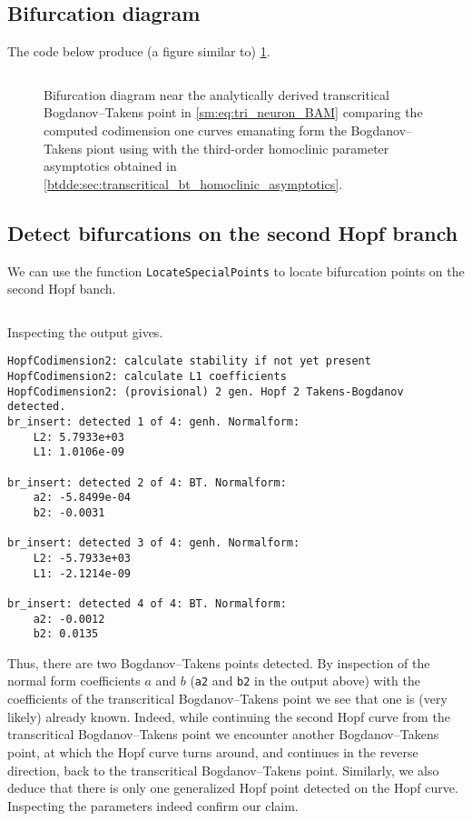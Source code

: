 \subsection{Bifurcation diagram}
The code below produce (a figure similar to) \cref{sm:fig:triNeuronBAMNeuralNetworkModelCompareParametersSupplementI}.
\inputminted[firstline=148, lastline=175]{MATLAB}{\pathToDDEBifToolDemos/BAM_neural_network_model/BAMnn.m}
%
\begin{figure}[ht]
\caption{Bifurcation diagram near the analytically derived transcritical
    Bogdanov--Takens point in \cref{sm:eq:tri_neuron_BAM} comparing the
    computed codimension one curves emanating form the Bogdanov--Takens piont
    using \DDEBIFTOOL with the third-order homoclinic parameter asymptotics
    obtained in \cref{btdde:sec:transcritical_bt_homoclinic_asymptotics}.}
\label{sm:fig:triNeuronBAMNeuralNetworkModelCompareParametersSupplementI}
\end{figure}

\subsection{Detect bifurcations on the second Hopf branch}
We can use the \DDEBIFTOOL function \texttt{LocateSpecialPoints} to
locate bifurcation points on the second Hopf banch.
\inputminted[firstline=177, lastline=178]{MATLAB}{\pathToDDEBifToolDemos/BAM_neural_network_model/BAMnn.m}

Inspecting the \MATLAB output gives.
\begin{verbatim}
HopfCodimension2: calculate stability if not yet present
HopfCodimension2: calculate L1 coefficients
HopfCodimension2: (provisional) 2 gen. Hopf 2 Takens-Bogdanov  detected.
br_insert: detected 1 of 4: genh. Normalform:
    L2: 5.7933e+03
    L1: 1.0106e-09

br_insert: detected 2 of 4: BT. Normalform:
    a2: -5.8499e-04
    b2: -0.0031

br_insert: detected 3 of 4: genh. Normalform:
    L2: -5.7933e+03
    L1: -2.1214e-09

br_insert: detected 4 of 4: BT. Normalform:
    a2: -0.0012
    b2: 0.0135
\end{verbatim}
Thus, there are two Bogdanov--Takens points detected. By inspection of the normal
form coefficients $a$ and $b$ (\texttt{a2} and
\texttt{b2} in the output above) with the coefficients of the
transcritical Bogdanov--Takens point we see that one is (very likely) already
known. Indeed, while continuing the second Hopf curve from the transcritical
Bogdanov--Takens point we encounter another Bogdanov--Takens point, at which
the Hopf curve turns around, and continues in the reverse direction, back to
the transcritical Bogdanov--Takens point. Similarly, we also deduce that there
is only one generalized Hopf point detected on the Hopf curve. Inspecting 
the parameters indeed confirm our claim.

